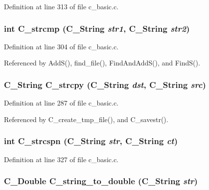 Definition at line 313 of file c\_\-basic.c.
\subsubsection{\setlength{\rightskip}{0pt plus 5cm}int C\_\-strcmp (\bf{C\_\-String} {\em str1}, \bf{C\_\-String} {\em str2})}\label{c__basic_8h_2388089332b1e34e3b731b322aa8065c}




Definition at line 304 of file c\_\-basic.c.

Referenced by Add\-S(), find\_\-file(), Find\-And\-Add\-S(), and Find\-S().
\subsubsection{\setlength{\rightskip}{0pt plus 5cm}\bf{C\_\-String} C\_\-strcpy (\bf{C\_\-String} {\em dst}, \bf{C\_\-String} {\em src})}\label{c__basic_8h_41b0f03bbee22df2e06acab0cefbea77}




Definition at line 287 of file c\_\-basic.c.

Referenced by C\_\-create\_\-tmp\_\-file(), and C\_\-savestr().
\subsubsection{\setlength{\rightskip}{0pt plus 5cm}int C\_\-strcspn (\bf{C\_\-String} {\em str}, \bf{C\_\-String} {\em ct})}\label{c__basic_8h_eb3d52b7de4c4578a68b262be7f4807f}




Definition at line 327 of file c\_\-basic.c.
\subsubsection{\setlength{\rightskip}{0pt plus 5cm}\bf{C\_\-Double} C\_\-string\_\-to\_\-double (\bf{C\_\-String} {\em str})}\label{c__basic_8h_673922efde029f4f6fea0f7ce8e9395e}




